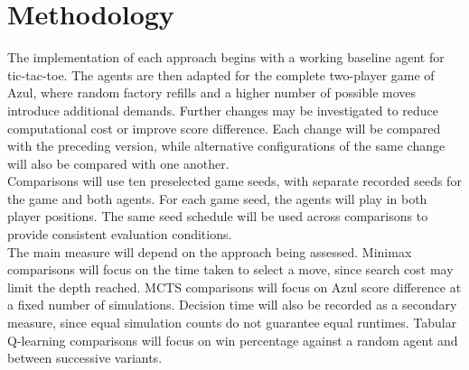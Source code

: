 \section{Methodology}
The implementation of each approach begins with a working baseline agent for tic-tac-toe. The agents are then adapted for the complete two-player game of Azul, where random factory refills and a higher number of possible moves introduce additional demands. Further changes may be investigated to reduce computational cost or improve score difference. Each change will be compared with the preceding version, while alternative configurations of the same change will also be compared with one another.\\

Comparisons will use ten preselected game seeds, with separate recorded seeds for the game and both agents. For each game seed, the agents will play in both player positions. The same seed schedule will be used across comparisons to provide consistent evaluation conditions.\\

The main measure will depend on the approach being assessed. Minimax comparisons will focus on the time taken to select a move, since search cost may limit the depth reached. MCTS comparisons will focus on Azul score difference at a fixed number of simulations. Decision time will also be recorded as a secondary measure, since equal simulation counts do not guarantee equal runtimes. Tabular Q-learning comparisons will focus on win percentage against a random agent and between successive variants.